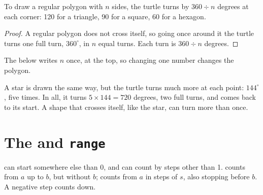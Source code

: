 \begin{proposition}\label{prop:g6:for-loops-turtle:angle}
To draw a regular polygon with $n$ sides, the turtle turns by $360 \div n$
degrees at each corner: 120 for a triangle, 90 for a square, 60 for a hexagon.
\end{proposition}

\begin{proof}
A regular polygon does not cross itself, so going once around it the turtle
turns one full turn, $360^\circ$, in $n$ equal turns. Each turn is
$360 \div n$ degrees.
\end{proof}

The  below writes $n$ once, at the top, so changing one number changes
the polygon.

\label{lst:g6:for-loops-turtle:polygon}

A star is drawn the same way, but the turtle turns much more at each point:
$144^\circ$, five times. In all, it turns $5 \times 144 = 720$ degrees, two full
turns, and comes back to its start. A shape that crosses itself, like the
star, can turn more than once.

\label{lst:g6:for-loops-turtle:star}

\section{The  and \texorpdfstring{\texttt{range}}{range}}

 can start somewhere else than 0, and can count by steps other
than 1.  counts from $a$ up to $b$, but without $b$;
 counts from $a$ in steps of $s$, also stopping before $b$.
A negative step counts down.

\label{lst:g6:for-loops-turtle:ranges}

\label{out:g6:for-loops-turtle:ranges}

